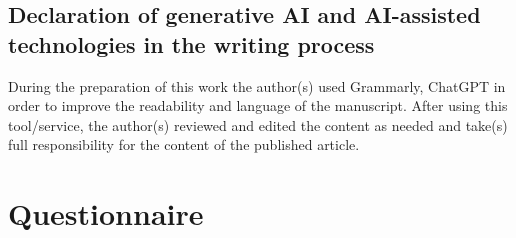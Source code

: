 \documentclass[
  11pt,
]{article}
\begin{document}
\subsection{Declaration of generative AI and AI-assisted technologies in the writing process}\label{declaration-of-generative-ai-and-ai-assisted-technologies-in-the-writing-process}

During the preparation of this work the author(s) used Grammarly, ChatGPT in order to improve the readability and language of the manuscript. After using this tool/service, the author(s) reviewed and edited the content as needed and take(s) full responsibility for the content of the published article.

\newpage

\section{Questionnaire}\label{questionnaire}
\end{document}
